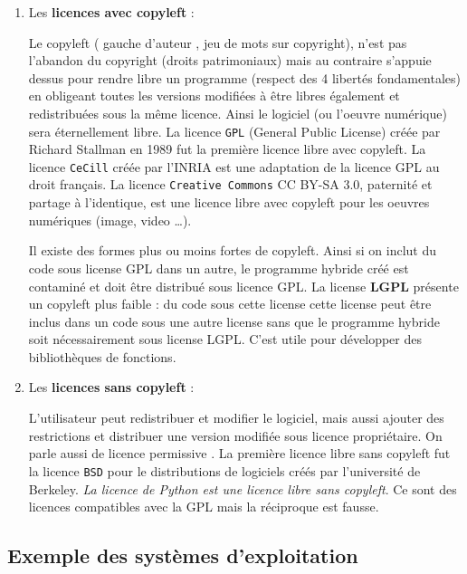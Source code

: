 \documentclass[
  11pt,
]{article}
\newcounter{prop}
\newcounter{def}
\newcounter{prog}
\newcounter{logi}
\begin{document}
\begin{enumerate}
\def\labelenumi{\arabic{enumi}.}
\item
  Les \textbf{licences avec copyleft} :

  Le copyleft ( gauche d'auteur , jeu de mots sur copyright), n'est pas
  l'abandon du copyright (droits patrimoniaux) mais au contraire
  s'appuie dessus pour rendre libre un programme (respect des 4 libertés
  fondamentales) en obligeant toutes les versions modifiées à être
  libres également et redistribuées sous la même licence. Ainsi le
  logiciel (ou l'oeuvre numérique) sera éternellement libre. La licence
  \texttt{GPL} (General Public License) créée par Richard Stallman en
  1989 fut la première licence libre avec copyleft. La licence
  \texttt{CeCill} créée par l'INRIA est une adaptation de la licence GPL
  au droit français. La licence \texttt{Creative\ Commons} CC BY-SA 3.0,
  paternité et partage à l'identique, est une licence libre avec
  copyleft pour les oeuvres numériques (image, video \ldots).

  Il existe des formes plus ou moins fortes de copyleft. Ainsi si on
  inclut du code sous license GPL dans un autre, le programme hybride
  créé est contaminé et doit être distribué sous licence GPL. La license
  \textbf{LGPL} présente un copyleft plus faible : du code sous cette
  license cette license peut être inclus dans un code sous une autre
  license sans que le programme hybride soit nécessairement sous license
  LGPL. C'est utile pour développer des bibliothèques de fonctions.
\item
  Les \textbf{licences sans copyleft} :

  L'utilisateur peut redistribuer et modifier le logiciel, mais aussi
  ajouter des restrictions et distribuer une version modifiée sous
  licence propriétaire. On parle aussi de licence permissive . La
  première licence libre sans copyleft fut la licence \texttt{BSD} pour
  le distributions de logiciels créés par l'université de Berkeley.
  \emph{La licence de Python est une licence libre sans copyleft}. Ce
  sont des licences compatibles avec la GPL mais la réciproque est
  fausse.
\end{enumerate}

\hypertarget{exemple-des-systuxe8mes-dexploitation}{%
\subsection{Exemple des systèmes
d'exploitation}\label{exemple-des-systuxe8mes-dexploitation}}
\end{document}
